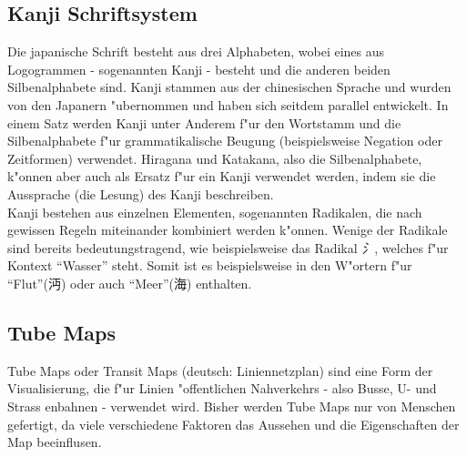 \subsection{Kanji Schriftsystem}
Die japanische Schrift besteht aus drei Alphabeten, wobei eines aus Logogrammen - sogenannten Kanji - besteht und die anderen beiden Silbenalphabete sind. Kanji stammen aus der chinesischen Sprache und wurden von den Japanern "ubernommen und haben sich seitdem parallel entwickelt. In einem Satz werden Kanji unter Anderem f"ur den Wortstamm und die Silbenalphabete f"ur grammatikalische Beugung (beispielsweise Negation oder Zeitformen) verwendet. Hiragana und Katakana, also die Silbenalphabete, k"onnen aber auch als Ersatz f"ur ein Kanji verwendet werden, indem sie die Aussprache (die Lesung) des Kanji beschreiben. \\
Kanji bestehen aus einzelnen Elementen, sogenannten Radikalen, die nach gewissen Regeln miteinander kombiniert werden k"onnen. Wenige der Radikale sind bereits bedeutungstragend, wie beispielsweise das Radikal \emph{氵}, welches f"ur Kontext "`Wasser"' steht. Somit ist es beispielsweise in den W"ortern f"ur "`Flut"'(沔) oder auch "`Meer"'(海) enthalten. 

\subsection{Tube Maps}
Tube Maps oder Transit Maps (deutsch: Liniennetzplan) sind eine Form der Visualisierung, die f"ur Linien "offentlichen Nahverkehrs - also Busse, U- und Strass enbahnen - verwendet wird. Bisher werden Tube Maps nur von Menschen gefertigt, da viele verschiedene Faktoren das Aussehen und die Eigenschaften der Map beeinflusen.  
